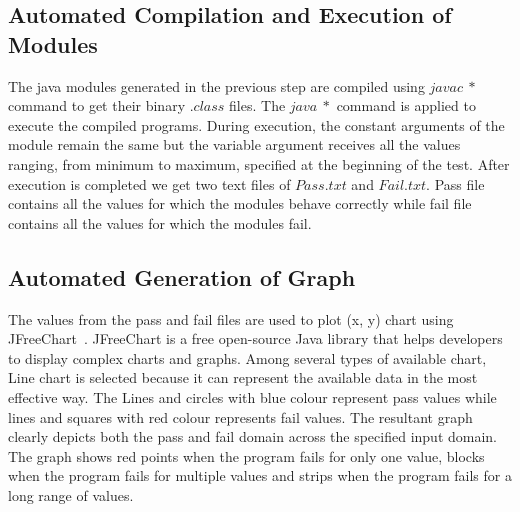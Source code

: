 \subsection{Automated Compilation and Execution of Modules}
The java modules generated in the previous step are compiled using $javac~*$ command to get their binary $.class$ files. The $java~*$ command is applied to execute the compiled programs. During execution, the constant arguments of the module remain the same but the variable argument receives all the values ranging, from minimum to maximum, specified at the beginning of the test. After execution is completed we get two text files of $Pass.txt$ and $Fail.txt$. Pass file contains all the values for which the modules behave correctly while fail file contains all the values for which the modules fail.

\subsection{Automated Generation of Graph}
The values from the pass and fail files are used to plot (x, y) chart using JFreeChart~\cite{gilbert2008jfreechart}. JFreeChart is a free open-source Java library that helps developers to display complex charts and graphs. Among several types of available chart, Line chart is selected because it can represent the available data in the most effective way. The Lines and circles with blue colour represent pass values while lines and squares with red colour represents fail values. The resultant graph clearly depicts both the pass and fail domain across the specified input domain. The graph shows red points when the program fails for only one value, blocks when the program fails for multiple values and strips when the program fails for a long range of values.%








